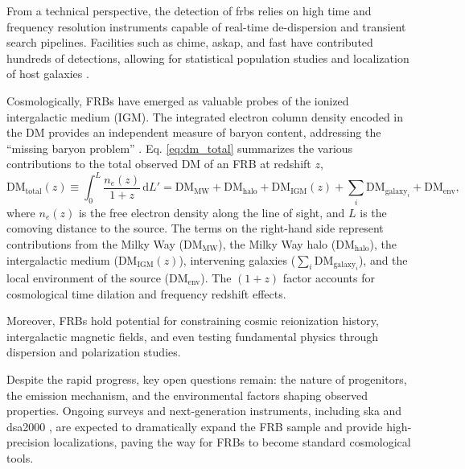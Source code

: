 From a technical perspective, the detection of \Glspl{frb} relies on high time and frequency resolution instruments capable of real-time de-dispersion and transient search pipelines. Facilities such as \Gls{chime}, \Gls{askap}, and \Gls{fast} have contributed hundreds of detections, allowing for statistical population studies and localization of host galaxies \citep{CHIMEcatalog2021, Shannon_2025}.

Cosmologically, FRBs have emerged as valuable probes of the ionized intergalactic medium (IGM). The integrated electron column density encoded in the DM provides an independent measure of baryon content, addressing the ``missing baryon problem'' \citep{Macquart_2020}. Eq. \ref{eq:dm_total} summarizes the various contributions to the total observed DM of an FRB at redshift $z$,
\begin{equation}
	\mathrm{DM}_{\text{total}}(z) \equiv \int_{0}^{L} \frac{n_e(z)}{1 + z} \, \mathrm{d}L' = \mathrm{DM}_{\text{MW}} + \mathrm{DM}_{\text{halo}} + \mathrm{DM}_{\text{IGM}}(z) + \sum_i \mathrm{DM}_{\text{galaxy}_i} + \mathrm{DM}_{\text{env}},
	\label{eq:dm_total}
\end{equation}
where $n_e(z)$ is the free electron density along the line of sight, and $L$ is the comoving distance to the source. The terms on the right-hand side represent contributions from the Milky Way ($\mathrm{DM}_{\text{MW}}$), the Milky Way halo ($\mathrm{DM}_{\text{halo}}$), the intergalactic medium ($\mathrm{DM}_{\text{IGM}}(z)$), intervening galaxies ($\sum_i \mathrm{DM}_{\text{galaxy}_i}$), and the local environment of the source ($\mathrm{DM}_{\text{env}}$). The $(1+z)$ factor accounts for cosmological time dilation and frequency redshift effects.



Moreover, FRBs hold potential for constraining cosmic reionization history, intergalactic magnetic fields, and even testing fundamental physics through dispersion and polarization studies.

Despite the rapid progress, key open questions remain: the nature of progenitors, the emission mechanism, and the environmental factors shaping observed properties. Ongoing surveys and next-generation instruments, including \Gls{ska} \citep{Weltman_2020} and \Gls{dsa2000} \citep{hallinan2019dsa2000radiosurvey}, are expected to dramatically expand the FRB sample and provide high-precision localizations, paving the way for FRBs to become standard cosmological tools.



